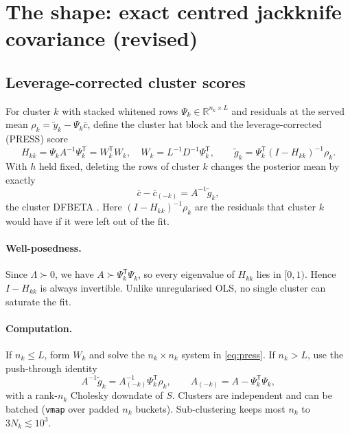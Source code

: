 \documentclass[11pt,a4paper]{article}
\newcommand{\R}{\mathbb{R}}
\newcommand{\T}{\mathsf{T}}
\newcommand{\cbar}{\bar{c}}
\newcommand{\gt}{\tilde{g}}
\newcommand{\code}[1]{\texttt{#1}}
\begin{document}
\section{The shape: exact centred jackknife covariance (revised)}\label{sec:shape}

\subsection{Leverage-corrected cluster scores}
For cluster $k$ with stacked whitened rows $\Psi_k\in\R^{n_k\times L}$ and residuals at the served mean
$\rho_k=\tilde y_k-\Psi_k\cbar$, define the cluster hat block and the leverage-corrected (PRESS) score
\begin{equation}
H_{kk}=\Psi_kA^{-1}\Psi_k^\T = W_k^\T W_k,\quad W_k=L^{-1}D^{-1}\Psi_k^\T,\qquad
\gt_k=\Psi_k^\T(I-H_{kk})^{-1}\rho_k .
\label{eq:press}
\end{equation}
With $h$ held fixed, deleting the rows of cluster $k$ changes the posterior mean by exactly
\begin{equation}
\cbar-\cbar_{(-k)} = A^{-1}\gt_k,
\label{eq:dfbeta}
\end{equation}
the cluster DFBETA \cite{cook1982}. Here $(I-H_{kk})^{-1}\rho_k$ are the residuals that cluster $k$
would have if it were left out of the fit.

\paragraph{Well-posedness.} Since $\Lambda\succ0$, we have $A\succ\Psi_k^\T\Psi_k$, so every eigenvalue
of $H_{kk}$ lies in $[0,1)$. Hence $I-H_{kk}$ is always invertible. Unlike unregularised OLS, no single
cluster can saturate the fit.

\paragraph{Computation.} If $n_k\le L$, form $W_k$ and solve the $n_k\times n_k$ system in
\eqref{eq:press}. If $n_k>L$, use the push-through identity
\begin{equation}
A^{-1}\gt_k = A_{(-k)}^{-1}\Psi_k^\T\rho_k,\qquad A_{(-k)}=A-\Psi_k^\T\Psi_k,
\end{equation}
with a rank-$n_k$ Cholesky downdate of $S$. Clusters are independent and can be batched (\code{vmap}
over padded $n_k$ buckets). Sub-clustering keeps most $n_k$ to $3N_k\lesssim10^3$.
\end{document}
